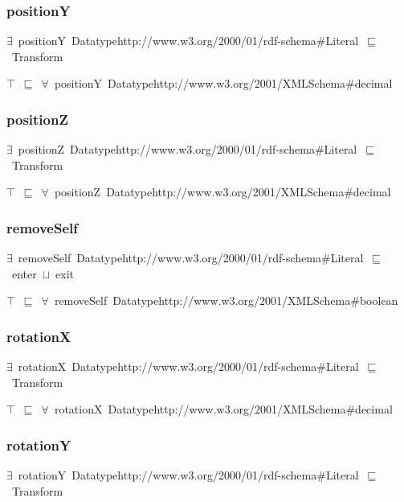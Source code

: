 \documentclass{article}
\begin{document}
\subsubsection*{positionY}

\ensuremath{\exists}~positionY~Datatypehttp://www.w3.org/2000/01/rdf-schema#Literal~\ensuremath{\sqsubseteq}~Transform

\ensuremath{\top}~\ensuremath{\sqsubseteq}~\ensuremath{\forall}~positionY~Datatypehttp://www.w3.org/2001/XMLSchema#decimal

\subsubsection*{positionZ}

\ensuremath{\exists}~positionZ~Datatypehttp://www.w3.org/2000/01/rdf-schema#Literal~\ensuremath{\sqsubseteq}~Transform

\ensuremath{\top}~\ensuremath{\sqsubseteq}~\ensuremath{\forall}~positionZ~Datatypehttp://www.w3.org/2001/XMLSchema#decimal

\subsubsection*{removeSelf}

\ensuremath{\exists}~removeSelf~Datatypehttp://www.w3.org/2000/01/rdf-schema#Literal~\ensuremath{\sqsubseteq}~enter~\ensuremath{\sqcup}~exit

\ensuremath{\top}~\ensuremath{\sqsubseteq}~\ensuremath{\forall}~removeSelf~Datatypehttp://www.w3.org/2001/XMLSchema#boolean

\subsubsection*{rotationX}

\ensuremath{\exists}~rotationX~Datatypehttp://www.w3.org/2000/01/rdf-schema#Literal~\ensuremath{\sqsubseteq}~Transform

\ensuremath{\top}~\ensuremath{\sqsubseteq}~\ensuremath{\forall}~rotationX~Datatypehttp://www.w3.org/2001/XMLSchema#decimal

\subsubsection*{rotationY}

\ensuremath{\exists}~rotationY~Datatypehttp://www.w3.org/2000/01/rdf-schema#Literal~\ensuremath{\sqsubseteq}~Transform
\end{document}
